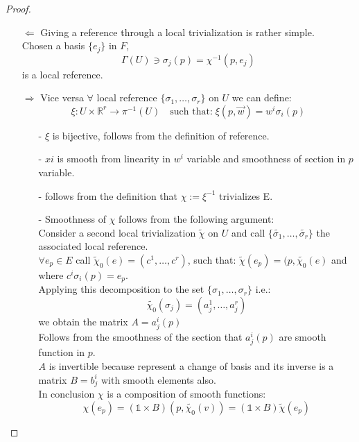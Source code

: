 \documentclass[a4paper,12pt]{scrartcl}    %
\begin{document}
\begin{proof}
\begin{itemize}
\item[$\Leftarrow$] Giving a reference through a local trivialization is rather simple.
	\\ Chosen a basis $\{ e_j \}$ in $F$,
	\begin{displaymath}
		\Gamma(U) \ni \sigma_j (p) = \chi^{-1}(p, e_j)
	\end{displaymath}	 
	is a local reference.

\item[$\Rightarrow$]
	Vice versa $\forall $ local reference $\{ \sigma_1, \ldots, \sigma_r \} $ on $U$ we can define:
	\begin{displaymath}
	\xi: U \times \mathbb{R}^r \rightarrow \pi^{-1}(U) \quad \textrm{such that:} \; \xi(p,\vec{w}) = w^i \sigma_i(p) 
	\end{displaymath}
	\begin{itemize}
	\item[-] $\xi$ is bijective, follows from the definition of reference.
	\item[-] $xi$ is smooth from linearity in $w^i$ variable and smoothness of section in $p$ variable. 
	\item[-] follows from the definition that $\chi := \xi^{-1}$ trivializes E.
	\item[-] Smoothness of $\chi$ follows from the following argument:
		\\ Consider a second local trivialization $\tilde{\chi}$ on $U$ and call $\{ \tilde{\sigma_1}, \ldots, \tilde{\sigma_r} \} $ the associated local reference.	
		\\ $\forall e_p \in E $ call $\tilde{\chi}_0 (e) = ( c^1 , \ldots, c^r)$, such that: $\tilde{\chi}(e_p) = ( p, \tilde{\chi_0}(e) $ and where $c^i \sigma_i (p) = e_p $.
		\\ Applying this decomposition to the set $\{ \sigma_1, \ldots, \sigma_r \} $ i.e.: 
		\begin{displaymath}
			\tilde{\chi_0}(\sigma_j)= ( a_j^1, \ldots, a_j^r)
		\end{displaymath}
		we obtain the matrix $A= a^i_j(p)$
		\\ Follows from the smoothness of the section that $a^i_j(p)$ are smooth function in $p$.
		\\ $A$ is invertible because represent a change of basis and its inverse is a matrix $B = b^i_j$ with smooth elements also.
		\\ In conclusion $\chi$ is a composition of smooth functions:
		\begin{displaymath}
		 \chi (e_p) = ( \mathds{1} \times B) ( p, \tilde{\chi_0}(v) ) = (\mathds{1} \times B ) \tilde{\chi}(e_p)
		\end{displaymath}
	\end{itemize}
\end{itemize}
\end{proof}
\end{document}
